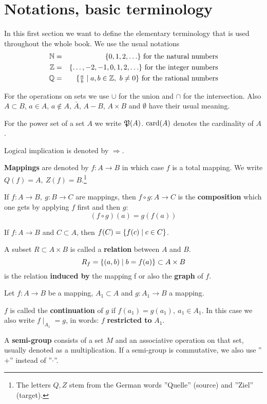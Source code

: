 \section{Notations, basic terminology}

In this first section we want to define the elementary terminology that is used
throughout the whole book. We use the usual notations
\begin{eqnarray*}
\mathbb{N} &=& \mbox{$\{0, 1, 2, \ldots\}$}\text{ for the natural numbers} \\
\mathbb{Z} &=& \mbox{$\{\ldots, -2, -1, 0, 1, 2, \ldots\}$}\text{ for the integer
numbers} \\
\mathbb{Q} &=& \mbox{$\{\frac{a}{b} \mid a,b \in \mathbb{Z},\ b \neq 0\}$}\text{
for the rational numbers}
\end{eqnarray*}

For the operations on sets we use $\cup$ for the union and $\cap$ for the
intersection. Also $A \subset B$, $a \in A$, $a \not\in A$, $\bar{A}$, $A - B$,
$A \times B$ and $\emptyset$ have their usual meaning.

For the power set of a set $A$ we write $\mathfrak{P}({A})$. $\mathrm{card}({A})$ denotes
the cardinality of $A$.

Logical implication is denoted by $\Rightarrow$.

{\bf Mappings} are denoted by $f : A \to B$ in which case $f$ is a
total mapping. We write $Q(f) = A,\ Z(f) = B$.\footnote{The letters $Q, Z$ stem 
from the German words ''Quelle'' (source) and ''Ziel'' (target).}

If $f: A \to B,\ g : B \to C$ are mappings, then $f \circ g : A
\to C$ is the {\bf composition} which one gets by applying $f$ first and then 
$g$:
\[(f \circ g)(a) = g(f(a))\]

If $f:A \to B$ and $C \subset A$, then $f(C) = \mbox{$\{f(c) \mid c \in C \}$}$.

A subset $R \subset A \times B$ is called a {\bf relation} between $A$ and $B$.
\[R_f = \mbox{$\{(a,b) \mid b = f(a) \}$} \subset A \times B\] 
is the relation {\bf induced by} the mapping f or also the {\bf graph} of $f$.

Let $f : A \to B$ be a mapping, $A_1 \subset A$ and $g : A_1 \to
B$ a mapping. 

$f$ is called the {\bf continuation} of $g$ if $f(a_1) = g(a_1),\ a_1 \in A_1$.
In this case we also write $f \mid _{A_1} = g$, in words: $f$ {\bf restricted to} $A_1$.

A {\bf semi-group} consists of a set $M$ and an associative operation on that
set, usually denoted as a multiplication. If a semi-group is commutative, we
also use ''$+$'' instead of ''$\cdot$''.

